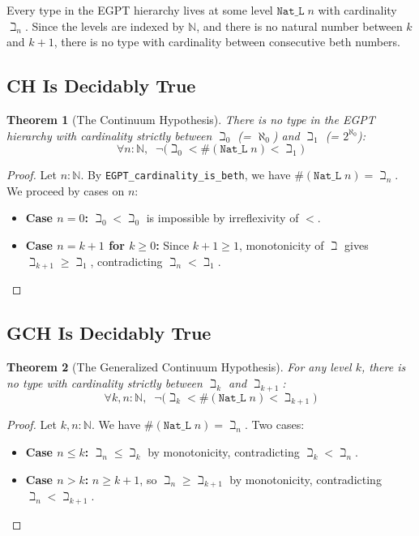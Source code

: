 \documentclass{report}
\newtheorem{theorem}{Theorem}
\begin{document}
Every type in the EGPT hierarchy lives at some level $\texttt{Nat\_L}\; n$ with
cardinality $\beth_n$. Since the levels are indexed by $\mathbb{N}$, and there
is no natural number between $k$ and $k + 1$, there is no type with cardinality
between consecutive beth numbers.

\subsection{CH Is Decidably True}

\begin{theorem}[The Continuum Hypothesis]
There is no type in the EGPT hierarchy with cardinality strictly between
$\beth_0$ (= $\aleph_0$) and $\beth_1$ (= $2^{\aleph_0}$):
$$\forall n : \mathbb{N},\;\; \neg\bigl(\beth_0 < \#(\texttt{Nat\_L}\; n) < \beth_1\bigr)$$
\end{theorem}

\begin{proof}
Let $n : \mathbb{N}$. By \texttt{EGPT\_cardinality\_is\_beth}, we have
$\#(\texttt{Nat\_L}\; n) = \beth_n$. We proceed by cases on $n$:

\begin{itemize}
\item \textbf{Case $n = 0$:} $\beth_0 < \beth_0$ is impossible by
irreflexivity of $<$.

\item \textbf{Case $n = k + 1$ for $k \geq 0$:} Since $k + 1 \geq 1$,
monotonicity of $\beth$ gives $\beth_{k+1} \geq \beth_1$, contradicting
$\beth_n < \beth_1$.
\end{itemize}
\end{proof}

\subsection{GCH Is Decidably True}

\begin{theorem}[The Generalized Continuum Hypothesis]
For any level $k$, there is no type with cardinality strictly between
$\beth_k$ and $\beth_{k+1}$:
$$\forall k, n : \mathbb{N},\;\; \neg\bigl(\beth_k < \#(\texttt{Nat\_L}\; n) < \beth_{k+1}\bigr)$$
\end{theorem}

\begin{proof}
Let $k, n : \mathbb{N}$. We have $\#(\texttt{Nat\_L}\; n) = \beth_n$. Two cases:

\begin{itemize}
\item \textbf{Case $n \leq k$:} $\beth_n \leq \beth_k$ by monotonicity,
contradicting $\beth_k < \beth_n$.

\item \textbf{Case $n > k$:} $n \geq k + 1$, so $\beth_n \geq \beth_{k+1}$
by monotonicity, contradicting $\beth_n < \beth_{k+1}$.
\end{itemize}
\end{proof}
\end{document}
